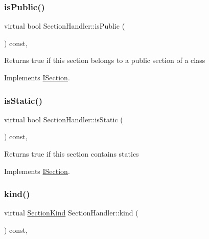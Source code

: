 \subsubsection{\texorpdfstring{isPublic()}{isPublic()}}
{\footnotesize\ttfamily virtual bool Section\+Handler\+::is\+Public (\begin{DoxyParamCaption}{ }\end{DoxyParamCaption}) const\hspace{0.3cm}{\ttfamily [inline]}, {\ttfamily [virtual]}}

Returns {\ttfamily true} if this section belongs to a public section of a class 

Implements \mbox{\hyperlink{class_i_section_a09f6dd61327d0cf67404cde8476be7a1}{I\+Section}}.

\mbox{\label{class_section_handler_a35d5f2bf1c1d2419934e50e370bd5088}} 
\subsubsection{\texorpdfstring{isStatic()}{isStatic()}}
{\footnotesize\ttfamily virtual bool Section\+Handler\+::is\+Static (\begin{DoxyParamCaption}{ }\end{DoxyParamCaption}) const\hspace{0.3cm}{\ttfamily [inline]}, {\ttfamily [virtual]}}

Returns {\ttfamily true} if this section contains statics 

Implements \mbox{\hyperlink{class_i_section_a8fb73cfd6c2d057b32ce07a89700ecef}{I\+Section}}.

\mbox{\label{class_section_handler_a09b0046032fbbb4189c2d5dd016475b8}} 
\subsubsection{\texorpdfstring{kind()}{kind()}}
{\footnotesize\ttfamily virtual \mbox{\hyperlink{class_i_section_af768cbfe7056fadbd0a67d26d0ef84e5}{Section\+Kind}} Section\+Handler\+::kind (\begin{DoxyParamCaption}{ }\end{DoxyParamCaption}) const\hspace{0.3cm}{\ttfamily [inline]}, {\ttfamily [virtual]}}


